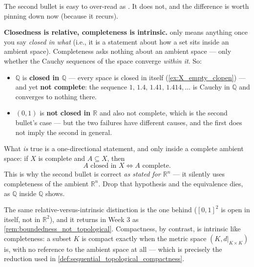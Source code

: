 \begin{remark}
\label{rem:complete_vs_closed}
The second bullet is easy to over-read as . It does not, and the
difference is worth pinning down now (because it recurs).

\textbf{Closedness is relative, completeness is intrinsic.}  only means anything once
you say \emph{closed in what} (i.e., it is a statement about how a set sits inside an ambient space).
Completeness asks nothing about an ambient space --- only whether the Cauchy sequences of the
space converge \emph{within it}. So:
\begin{itemize}
  \item $\mathbb{Q}$ is \textbf{closed in $\mathbb{Q}$} --- every space is closed in itself
    (\cref{ex:X_empty_clopen}) --- and yet \textbf{not complete}: the sequence
    $1,\,1.4,\,1.41,\,1.414,\dots$ is Cauchy in $\mathbb{Q}$ and converges to nothing there.
  \item $(0,1)$ is \textbf{not closed in $\mathbb{R}$} and also not complete, which is the
    second bullet's case --- but the two failures have different causes, and the first does not
    imply the second in general.
\end{itemize}

What \emph{is} true is a one-directional statement, and only inside a complete ambient space:
if $X$ is complete and $A \subseteq X$, then
\[A \text{ closed in } X \iff A \text{ complete}.\]
This is why the second bullet is correct \emph{as stated for $\mathbb{R}^n$} --- it silently uses
completeness of the ambient $\mathbb{R}^n$. Drop that hypothesis and the equivalence dies, as
$\mathbb{Q}$ inside $\mathbb{Q}$ shows.

\begin{ainote}
The same relative-versus-intrinsic distinction is the one behind
 ($[0,1]^2$ is open in itself, not in $\mathbb{R}^2$), and it
returns in Week 3 as \cref{rem:boundedness_not_topological}. Compactness, by contrast, is
intrinsic like completeness: a subset $K$ is compact exactly when the metric space
$(K, d|_{K\times K})$ is, with no reference to the ambient space at all --- which is precisely
the reduction used in \cref{def:sequential_topological_compactness}.
\end{ainote}
\end{remark}

